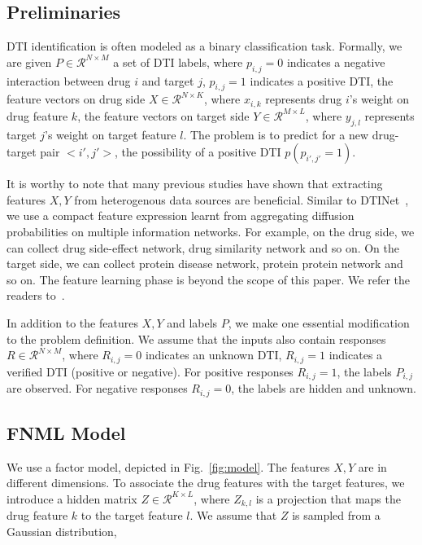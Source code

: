 \documentclass[sigconf,anonymous]{acmart}
\begin{document}
\subsection{Preliminaries}\label{sec:input}
DTI identification is often modeled as a binary classification task. Formally, we are given $P\in \mathcal{R}^{N\times M}$ a set of DTI labels, where $p_{i,j}=0$ indicates a negative interaction between drug $i$ and target $j$, $p_{i,j}=1$ indicates a positive DTI, the feature vectors on drug side $X\in \mathcal{R}^{N \times K}$, where $x_{i,k}$ represents drug $i$'s weight on drug feature $k$, the feature vectors on target side $Y\in \mathcal{R}^{M \times L}$, where $y_{j,l}$ represents target $j$'s weight on target feature $l$. The problem is to predict for a new drug-target pair $<i',j'>$, the possibility of a positive DTI $p(p_{i',j'}=1)$.

It is worthy to note that many previous studies have shown that extracting features $X,Y$ from heterogenous data sources are beneficial. Similar to DTINet~\cite{Luo2017Network}, we use a compact feature expression learnt from aggregating diffusion probabilities on multiple information networks. For example, on the drug side, we can collect drug side-effect network, drug similarity network and so on. On the target side, we can collect protein disease network, protein protein network and so on. The feature learning phase is beyond the scope of this paper. We refer the readers to~\cite{Luo2017Network}.

In addition to the features $X,Y$ and labels $P$, we make one essential modification to the problem definition. We assume that the inputs also contain responses $R\in \mathcal{R}^{N\times M}$, where $R_{i,j}=0$ indicates an unknown DTI, $R_{i,j}=1$ indicates a verified DTI (positive or negative). For positive responses $R_{i,j}=1$, the labels $P_{i,j}$ are observed. For negative responses $R_{i,j}=0$, the labels are hidden and unknown.

\subsection{FNML Model}\label{sec:model}

We use a factor model, depicted in Fig.~\ref{fig:model}. The features $X,Y$ are in different dimensions. To associate the drug features with the target features, we introduce a hidden matrix $Z\in\mathcal{R}^{K\times L}$, where $Z_{k,l}$ is a projection that maps the drug feature $k$ to the target feature $l$. We assume that $Z$ is sampled from a Gaussian distribution,
\end{document}

